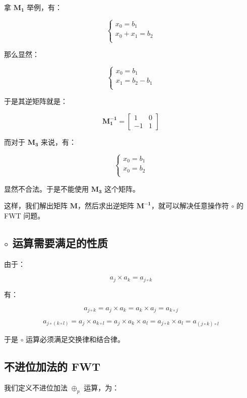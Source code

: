 \documentclass{article}
\begin{document}
拿 $\mathbf{M_1}$ 举例，有：

$$
\begin{cases}
    x_0 = b_1 \\
    x_0 + x_1 =b_2 \\
\end{cases}
$$

那么显然：

$$
\begin{cases}
	x_0 = b_1 \\
	x_1 = b_2-b_1 \\
\end{cases}
$$

于是其逆矩阵就是：

$$\mathbf{M_1^{-1}}=\begin{bmatrix} 1 & 0 \\ -1 & 1 \end{bmatrix}$$

而对于 $\mathbf{M_3}$ 来说，有：

$$
\begin{cases}
	x_0 = b_1 \\
	x_0 = b_2 \\
\end{cases}
$$

显然不合法。于是不能使用 $\mathbf{M_3}$ 这个矩阵。

这样，我们解出矩阵 $\mathbf{M}$，然后求出逆矩阵 $\mathbf{M^{-1}}$，就可以解决任意操作符 $\circ$ 的 FWT 问题。

\subsection{$\circ$ 运算需要满足的性质}

由于：

$$a_{j} \times a_{k}=a_{j \circ k}$$

有：

$$
a_{j \circ k}=a_j \times a_k=a_k \times a_j=a_{k \circ j}
$$

$$
a_{j \circ (k \circ l)}=a_j \times a_{k \circ l}=a_j \times a_k \times a_l=a_{j \circ k} \times a_{l}=a_{(j \circ k)\circ l}
$$

于是 $\circ$ 运算必须满足交换律和结合律。

\subsection{不进位加法的 FWT}

我们定义不进位加法 $\oplus_p$ 运算，为：
\end{document}
